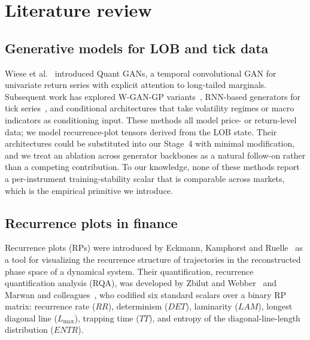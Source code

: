 \section{Literature review}

\subsection*{Generative models for LOB and tick data}
Wiese et al.~\cite{wiese2020quant} introduced Quant GANs, a temporal
convolutional GAN for univariate return series with explicit attention
to long-tailed marginals. Subsequent work has explored W-GAN-GP
variants~\cite{takahashi2019modeling}, RNN-based generators for tick
series~\cite{koshiyama2020generative}, and conditional architectures
that take volatility regimes or macro indicators as conditioning input.
These methods all model price- or return-level data; we model
recurrence-plot tensors derived from the LOB state. Their architectures
could be substituted into our Stage~4 with minimal modification, and we
treat an ablation across generator backbones as a natural follow-on
rather than a competing contribution. To our knowledge, none of these
methods report a per-instrument training-stability scalar that is
comparable across markets, which is the empirical primitive we
introduce.

\subsection*{Recurrence plots in finance}
Recurrence plots (RPs) were introduced by Eckmann, Kamphorst and
Ruelle~\cite{eckmann1987} as a tool for visualizing the recurrence
structure of trajectories in the reconstructed phase space of a
dynamical system. Their quantification, recurrence quantification
analysis (RQA), was developed by Zbilut and Webber~\cite{zbilut1992}
and Marwan and colleagues~\cite{marwan2007}, who codified six standard
scalars over a binary RP matrix: recurrence rate ($RR$), determinism
($DET$), laminarity ($LAM$), longest diagonal line ($L_{\max}$),
trapping time ($TT$), and entropy of the diagonal-line-length
distribution ($ENTR$).

